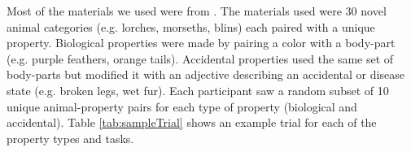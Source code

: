 \documentclass[10pt,letterpaper]{article}
\begin{document}
%
 
Most of the materials we used were from \citeauthor{Cimpian2010}. 
The materials used were 30 novel animal categories (e.g. lorches, morseths, blins) each paired with a unique property. 
Biological properties were made by pairing a color with a body-part (e.g. purple feathers, orange tails). 
Accidental properties used the same set of body-parts but modified it with an adjective describing an accidental or disease state (e.g. broken legs, wet fur). 
Each participant saw a random subset of 10 unique animal-property pairs for each type of property (biological and accidental). 
Table \ref{tab:sampleTrial} shows an example trial for each of the property types and tasks.
\end{document}
